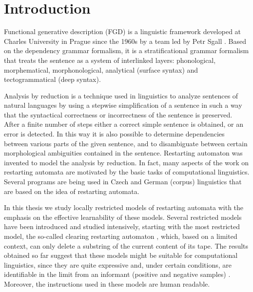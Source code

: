 \chapter*{Introduction}

Functional generative description (FGD) is a linguistic framework developed at Charles University in Prague since the 1960s by a team led by Petr Sgall \cite{SgNeGoHa69}. Based on the dependency grammar formalism, it is a stratificational grammar formalism that treats the sentence as a system of interlinked layers: phonological, morphematical, morphonological, analytical (surface syntax) and tectogrammatical (deep syntax).

Analysis by reduction \cite{LoPlKu05} is a technique used in linguistics to analyze sentences of natural languages by using a stepwise simplification of a sentence in such a way that the syntactical correctness or incorrectness of the sentence is preserved. After a finite number of steps either a correct simple sentence is obtained, or an error is detected. In this way it is also possible to determine dependencies between various parts of the given sentence, and to disambiguate between certain morphological ambiguities contained in the sentence. Restarting automaton \cite{JMPV95,O06} was invented to model the analysis by reduction. In fact, many aspects of the work on restarting automata are motivated by the basic tasks of computational linguistics. Several programs are being used in Czech and German (corpus) linguistics that are based on the idea of restarting automata. 

In this thesis we study locally restricted models of restarting automata with the emphasis on the effective learnability of these models. Several restricted models have been introduced and studied intensively, starting with the most restricted model, the so-called clearing restarting automaton \cite{CM10}, which, based on a limited context, can only delete a substring of the current content of its tape. The results obtained so far suggest that these models might be suitable for computational linguistics, since they are quite expressive and, under certain conditions, are identifiable in the limit from an informant (positive and negative samples) \cite{C12}. Moreover, the instructions used in these models are human readable.

